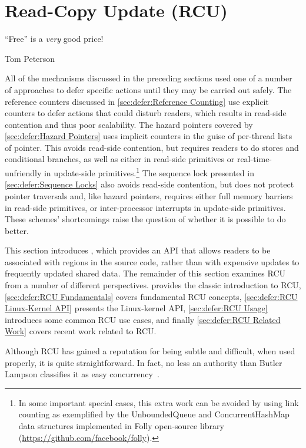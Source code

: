 
\section{Read-Copy Update (RCU)}
\label{sec:defer:Read-Copy Update (RCU)}
%
\epigraph{``Free'' is a \emph{very} good price!}{Tom Peterson}

All of the mechanisms discussed in the preceding sections
used one of a number of approaches to defer specific actions
until they may be carried out safely.
The reference counters discussed in
\cref{sec:defer:Reference Counting}
use explicit counters to defer actions that could disturb readers,
which results in read-side contention and thus poor scalability.
The hazard pointers covered by
\cref{sec:defer:Hazard Pointers}
uses implicit counters in the guise of per-thread lists of pointer.
This avoids read-side contention, but requires readers to do stores and
conditional branches, as well as either 
in read-side primitives or real-time-unfriendly  in
update-side primitives.\footnote{
	In some important special cases, this extra work can be avoided
	by using link counting as exemplified by the UnboundedQueue
	and ConcurrentHashMap data structures implemented in Folly
	open-source library
	(\url{https://github.com/facebook/folly}).}
The sequence lock presented in
\cref{sec:defer:Sequence Locks}
also avoids read-side contention, but does not protect pointer
traversals and, like hazard pointers, requires either full memory barriers
in read-side primitives, or inter-processor interrupts in update-side
primitives.
These schemes' shortcomings raise the question of
whether it is possible to do better.

This section introduces , which provides
an API that allows readers to be associated with regions in the source code,
rather than with expensive updates to frequently updated shared data.
The remainder of this
section examines RCU from a number of different perspectives.
 provides the classic
introduction to RCU,
\cref{sec:defer:RCU Fundamentals} covers fundamental RCU
concepts,
\cref{sec:defer:RCU Linux-Kernel API} presents the Linux-kernel
API,
\cref{sec:defer:RCU Usage} introduces some common RCU use cases,
and finally
\cref{sec:defer:RCU Related Work} covers recent work related
to RCU.

Although RCU has gained a reputation for being subtle and difficult,
when used properly, it is quite straightforward.
In fact, no less an authority than Butler Lampson classifies it as easy
concurrency~\cite[Chapter 3]{Apt-Hoare2022Dijkstra}.






